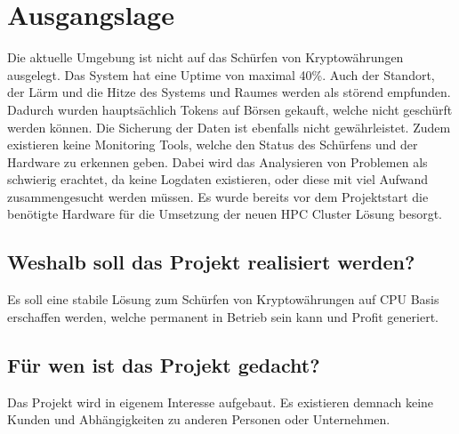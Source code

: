 
\section{Ausgangslage}
Die aktuelle Umgebung ist nicht auf das Schürfen von Kryptowährungen ausgelegt. Das System hat eine Uptime von maximal 40\%. Auch der Standort, der Lärm und die Hitze des Systems und Raumes werden als störend empfunden. Dadurch wurden hauptsächlich Tokens auf Börsen gekauft, welche nicht geschürft werden können. Die Sicherung der Daten ist ebenfalls nicht gewährleistet. Zudem existieren keine Monitoring Tools, welche den Status des Schürfens und der Hardware zu erkennen geben. Dabei wird das Analysieren von Problemen als schwierig erachtet, da keine Logdaten existieren, oder diese mit viel Aufwand zusammengesucht werden müssen. Es wurde bereits vor dem Projektstart die benötigte Hardware für die Umsetzung der neuen HPC Cluster Lösung besorgt.


\subsection{Weshalb soll das Projekt realisiert werden?}
Es soll eine stabile Lösung zum Schürfen von Kryptowährungen auf CPU Basis erschaffen werden, welche permanent in Betrieb sein kann und Profit generiert.

\subsection{Für wen ist das Projekt gedacht?}
Das Projekt wird in eigenem Interesse aufgebaut. Es existieren demnach keine Kunden und Abhängigkeiten zu anderen Personen oder Unternehmen.

